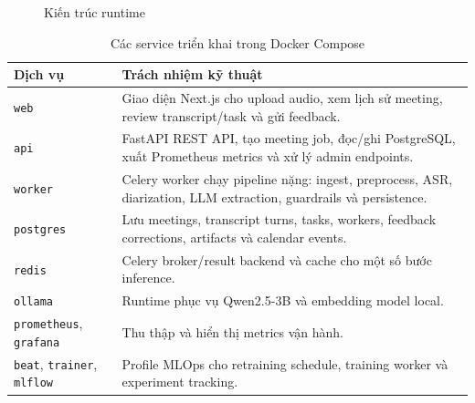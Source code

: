 \begin{figure}[H]
\centering
{}
\caption{Kiến trúc runtime}
\label{fig:runtime}
\end{figure}

\begin{table}[H]
\centering
\small
\caption{Các service triển khai trong Docker Compose}
\label{tab:runtime-services}
\begin{tabularx}{\textwidth}{@{}p{2.8cm}X@{}}
\toprule
\textbf{Dịch vụ} & \textbf{Trách nhiệm kỹ thuật} \\
\midrule
\texttt{web} & Giao diện Next.js cho upload audio, xem lịch sử meeting, review transcript/task và gửi feedback. \\
\texttt{api} & FastAPI REST API, tạo meeting job, đọc/ghi PostgreSQL, xuất Prometheus metrics và xử lý admin endpoints. \\
\texttt{worker} & Celery worker chạy pipeline nặng: ingest, preprocess, ASR, diarization, LLM extraction, guardrails và persistence. \\
\texttt{postgres} & Lưu meetings, transcript turns, tasks, workers, feedback corrections, artifacts và calendar events. \\
\texttt{redis} & Celery broker/result backend và cache cho một số bước inference. \\
\texttt{ollama} & Runtime phục vụ Qwen2.5-3B và embedding model local. \\
\texttt{prometheus}, \texttt{grafana} & Thu thập và hiển thị metrics vận hành. \\
\texttt{beat}, \texttt{trainer}, \texttt{mlflow} & Profile MLOps cho retraining schedule, training worker và experiment tracking. \\
\bottomrule
\end{tabularx}
\end{table}

